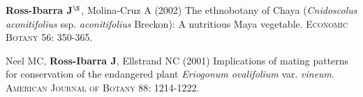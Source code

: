 \documentclass[letterpaper,10pt]{article}
\begin{document}
\begin{etaremune}
\item {\bf Ross-Ibarra J}$^\S$, Molina-Cruz A (2002) The ethnobotany of Chaya (\emph{Cnidoscolus aconitifolius} ssp. \emph{aconitifolius} Breckon): A nutritious Maya vegetable. \textsc{Economic Botany} 56: 350-365.

\item  Neel MC, {\bf Ross-Ibarra J}, Ellstrand NC (2001) Implications of mating patterns for conservation of the endangered plant \emph{Eriogonum ovalifolium} var. \emph{vineum}.  \textsc{American Journal of Botany} 88: 1214-1222.
\end{etaremune}


\end{document}
